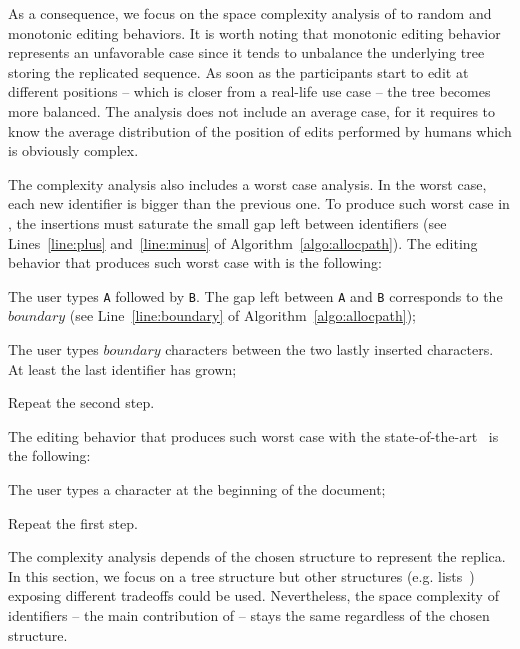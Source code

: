\noindent As a consequence, we focus on the space complexity analysis of \LSEQ
to random and monotonic editing behaviors. It is worth noting that monotonic
editing behavior represents an unfavorable case since it tends to unbalance the
underlying tree storing the replicated sequence. As soon as the participants
start to edit at different positions -- which is closer from a real-life use
case -- the tree becomes more balanced.
The analysis does not include an average case, for it requires to know
the average distribution of the position of edits performed by humans which is
obviously complex.

\noindent The complexity analysis also includes a worst case analysis. In the
worst case, each new identifier is bigger than the previous one. To produce such
worst case in \LSEQ, the insertions must saturate the small gap left between
identifiers (see Lines~\ref{line:plus} and~\ref{line:minus} of
Algorithm~\ref{algo:allocpath}). The editing behavior that produces such worst
case with \LSEQ is the following:
\begin{inparaenum}[(1)]
\item The user types \texttt{A} followed by \texttt{B}. The gap left between
  \texttt{A} and \texttt{B} corresponds to the $boundary$ (see
  Line~\ref{line:boundary} of Algorithm~\ref{algo:allocpath});
\item The user types $boundary$ characters between the two lastly inserted
  characters. At least the last identifier has grown;
\item Repeat the second step.
\end{inparaenum}
The editing behavior that produces such worst case with the
state-of-the-art~\cite{preguica2009commutative, weiss2009logoot} is the
following:
\begin{inparaenum}[(1)]
\item The user types a character at the beginning of the document;
\item Repeat the first step.
\end{inparaenum}



The complexity analysis depends of the chosen structure to represent the
replica. In this section, we focus on a tree structure but other structures
(e.g. lists~\cite{weiss2009logoot}) exposing different tradeoffs could be
used. Nevertheless, the space complexity of identifiers -- the main contribution
of \LSEQ{} -- stays the same regardless of the chosen structure.

